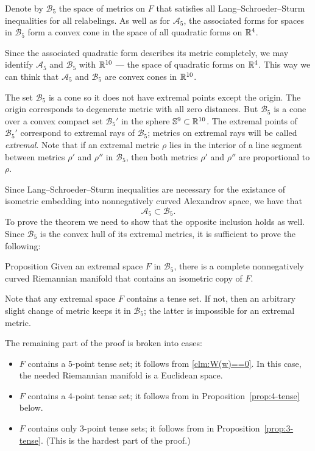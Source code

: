 \documentclass{article}
\begin{document}
Denote by $\mathcal{B}_5$ the space of metrics on $F$ that satisfies all Lang--Schroeder--Sturm inequalities for all relabelings.
As well as for $\mathcal{A}_5$, the associated forms for spaces in $\mathcal{B}_5$ form a convex cone in the space of all quadratic forms on $\mathbb{R}^4$.

Since the associated quadratic form describes its metric completely, we may identify $\mathcal{A}_5$ and $\mathcal{B}_5$ with $\mathbb{R}^{10}$ --- the space of quadratic forms on $\mathbb{R}^4$.
This way we can think that $\mathcal{A}_5$ and $\mathcal{B}_5$ are convex cones in $\mathbb{R}^{10}$.

The set $\mathcal{B}_5$ is a cone so it does not have extremal points except the origin.
The origin corresponds to degenerate metric with all zero distances.
But $\mathcal{B}_5$ is a cone over a convex compact set $\mathcal{B}_5'$ in the sphere $\mathbb{S}^9\subset \mathbb{R}^{10}$.
The extremal points of $\mathcal{B}_5'$ correspond to extremal rays of $\mathcal{B}_5$;
metrics on extremal rays will be called \emph{extremal}.
Note that if an extremal metric $\rho$ lies in the interior of a line segment between metrics $\rho'$ and $\rho''$ in $\mathcal{B}_5$, then both metrics $\rho'$ and $\rho''$ are proportional to $\rho$.

Since Lang--Schroeder--Sturm inequalities are necessary for the existance of isometric embedding into nonnegatively curved Alexandrov space,
we have that 
\[\mathcal{A}_5\subset\mathcal{B}_5.\]
To prove the theorem we need to show that the opposite inclusion holds as well.
Since $\mathcal{B}_5$ is the convex hull of its extremal metrics, it is sufficient to prove the following:

\begin{thm}{Proposition}\label{prop:main}
Given an extremal space $F$ in $\mathcal{B}_5$, there is a complete nonnegatively curved Riemannian manifold that contains an isometric copy of $F$.
\end{thm}

Note that any extremal space  $F$ contains a tense set.
If not, then an arbitrary slight change of metric keeps it in $\mathcal{B}_5$;
the latter is impossible for an extremal metric.

The remaining part of the proof is broken into cases:
\begin{itemize}
\item $F$ contains a 5-point  tense set; it follows from \ref{clm:W(w)==0}.
In this case, the needed Riemannian manifold is a Euclidean space.
\item $F$ contains a 4-point  tense set; it follows from in Proposition~\ref{prop:4-tense} below.
\item $F$ contains only 3-point  tense sets; it follows from in Proposition~\ref{prop:3-tense}. (This is the hardest part of the proof.) 
\qeds
\end{itemize}
\end{document}
